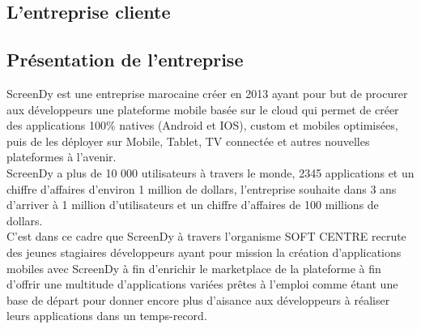 \documentclass[12pt,a4paper]{report}
\begin{document}
	\subsection{L'entreprise cliente}
		\subsection{Présentation de l'entreprise}
ScreenDy est une entreprise marocaine créer en 2013 ayant pour but de procurer aux développeurs une plateforme mobile basée sur le cloud qui permet de créer des applications 100\% natives (Android et IOS), custom et mobiles optimisées, puis de les déployer sur Mobile, Tablet, TV connectée et autres nouvelles plateformes à l'avenir.\\
ScreenDy a plus de 10 000 utilisateurs à travers le monde, 2345 applications et un chiffre d'affaires d'environ 1 million de dollars, l'entreprise souhaite dans 3 ans d'arriver à 1 million d'utilisateurs et un chiffre d'affaires de 100 millions de dollars.\\
C'est dans ce cadre que ScreenDy à travers l'organisme SOFT CENTRE recrute des jeunes stagiaires développeurs ayant pour mission la création d'applications mobiles avec ScreenDy à fin d'enrichir le \guillemotleft marketplace \guillemotright de la plateforme à fin d'offrir une multitude d'applications variées prêtes à l'emploi comme étant une base de départ pour donner encore plus d'aisance aux développeurs à réaliser leurs applications dans un temps-record.
\end{document}
